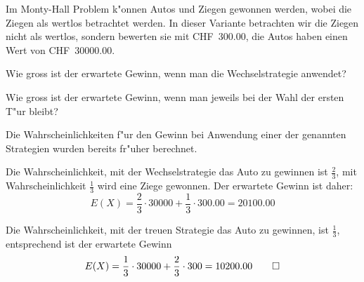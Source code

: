 Im Monty-Hall Problem k"onnen Autos und Ziegen gewonnen werden, wobei
die Ziegen als wertlos betrachtet werden. In dieser Variante betrachten
wir die Ziegen nicht als wertlos, sondern bewerten sie mit CHF~300.00,
die Autos haben einen Wert von CHF~30000.00.
\begin{teilaufgaben}
\item Wie gross ist der erwartete Gewinn, wenn man die Wechselstrategie
anwendet?
\item Wie gross ist der erwartete Gewinn, wenn man jeweils bei der Wahl
der ersten T"ur bleibt?
\end{teilaufgaben}

\begin{loesung}
Die Wahrscheinlichkeiten f"ur den Gewinn bei Anwendung einer der
genannten Strategien wurden bereits fr"uher berechnet.
\begin{teilaufgaben}
\item
Die Wahrscheinlichkeit, mit der Wechselstrategie das Auto zu gewinnen
ist $\frac23$, mit Wahrscheinlichkeit $\frac13$ wird eine Ziege gewonnen.
Der erwartete Gewinn ist daher:
\[
E(X)=\frac23\cdot 30000+\frac13\cdot 300.00=20100.00
\]
\item
Die Wahrscheinlichkeit, mit der treuen Strategie das Auto zu
gewinnen, ist $\frac13$, entsprechend ist der erwartete Gewinn
\[
E(X)=\frac13\cdot 30000+\frac23\cdot 300=10200.00
\qedhere
\]
\end{teilaufgaben}
\end{loesung}

